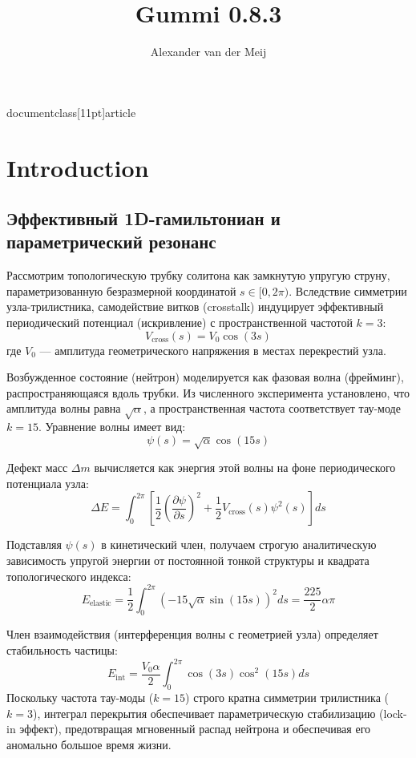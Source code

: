 documentclass[11pt]{article}
    \title{\textbf{Gummi 0.8.3}}
    \author{Alexander van der Meij}
    \date{}
    
    \addtolength{\topmargin}{-3cm}
    \addtolength{\textheight}{3cm}


\maketitle
\thispagestyle{empty}

\section{Introduction}
\subsection{Эффективный 1D-гамильтониан и параметрический резонанс}

Рассмотрим топологическую трубку солитона как замкнутую упругую струну, параметризованную безразмерной координатой $s \in [0, 2\pi)$. Вследствие симметрии узла-трилистника, самодействие витков (crosstalk) индуцирует эффективный периодический потенциал (искривление) с пространственной частотой $k=3$:
\begin{equation}
    V_{\text{cross}}(s) = V_0 \cos(3s)
\end{equation}
где $V_0$ — амплитуда геометрического напряжения в местах перекрестий узла.

Возбужденное состояние (нейтрон) моделируется как фазовая волна (фрейминг), распространяющаяся вдоль трубки. Из численного эксперимента установлено, что амплитуда волны равна $\sqrt{\alpha}$, а пространственная частота соответствует тау-моде $k=15$. Уравнение волны имеет вид:
\begin{equation}
    \psi(s) = \sqrt{\alpha} \cos(15s)
\end{equation}

Дефект масс $\Delta m$ вычисляется как энергия этой волны на фоне периодического потенциала узла:
\begin{equation}
    \Delta E = \int_0^{2\pi} \left[ \frac{1}{2} \left( \frac{\partial \psi}{\partial s} \right)^2 + \frac{1}{2} V_{\text{cross}}(s) \psi^2(s) \right] ds
\end{equation}

Подставляя $\psi(s)$ в кинетический член, получаем строгую аналитическую зависимость упругой энергии от постоянной тонкой структуры и квадрата топологического индекса:
\begin{equation}
    E_{\text{elastic}} = \frac{1}{2} \int_0^{2\pi} \left( -15 \sqrt{\alpha} \sin(15s) \right)^2 ds = \frac{225}{2} \alpha \pi
\end{equation}

Член взаимодействия (интерференция волны с геометрией узла) определяет стабильность частицы:
\begin{equation}
    E_{\text{int}} = \frac{V_0 \alpha}{2} \int_0^{2\pi} \cos(3s) \cos^2(15s) ds
\end{equation}
Поскольку частота тау-моды ($k=15$) строго кратна симметрии трилистника ($k=3$), интеграл перекрытия обеспечивает параметрическую стабилизацию (lock-in эффект), предотвращая мгновенный распад нейтрона и обеспечивая его аномально большое время жизни.
